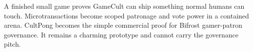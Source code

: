 \ProjectionBand
{A finished small game proves GameCult can ship something normal humans can touch.}
{Microtransactions become scoped patronage and vote power in a contained arena.}
{CultPong becomes the simple commercial proof for Bifrost gamer-patron governance.}
{It remains a charming prototype and cannot carry the governance pitch.}


